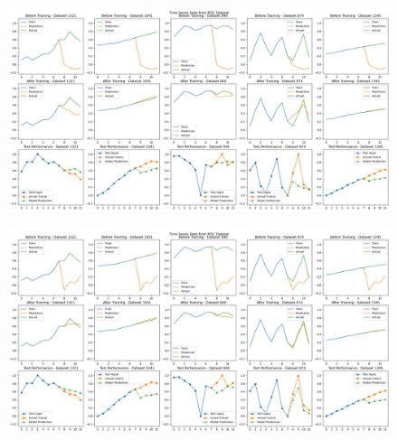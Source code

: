 \documentclass{article}
\begin{document}
	\begin{figure}[htbp]
		\includegraphics[width=520pt]{model1.png}
	\end{figure}
	\begin{figure}[htbp]
		\includegraphics[width=520pt]{model2.png}
	\end{figure}
	
\end{document}
